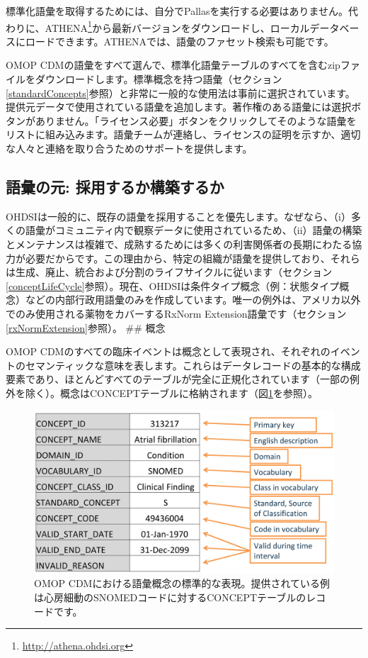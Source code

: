 \documentclass[
  11pt]{book}
\theoremstyle{definition}
\theoremstyle{definition}
\theoremstyle{definition}
\theoremstyle{definition}
\theoremstyle{remark}
\begin{document}
標準化語彙を取得するためには、自分でPallasを実行する必要はありません。代わりに、ATHENA\footnote{\url{http://athena.ohdsi.org}}から最新バージョンをダウンロードし、ローカルデータベースにロードできます。ATHENAでは、語彙のファセット検索も可能です。   

OMOP CDMの語彙をすべて選んで、標準化語彙テーブルのすべてを含むzipファイルをダウンロードします。標準概念を持つ語彙（セクション\ref{standardConcepts}参照）と非常に一般的な使用法は事前に選択されています。提供元データで使用されている語彙を追加します。著作権のある語彙には選択ボタンがありません。「ライセンス必要」ボタンをクリックしてそのような語彙をリストに組み込みます。語彙チームが連絡し、ライセンスの証明を示すか、適切な人々と連絡を取り合うためのサポートを提供します。

\subsection{語彙の元: 採用するか構築するか}\label{ux8a9eux5f59ux306eux5143-ux63a1ux7528ux3059ux308bux304bux69cbux7bc9ux3059ux308bux304b}

OHDSIは一般的に、既存の語彙を採用することを優先します。なぜなら、（i）多くの語彙がコミュニティ内で観察データに使用されているため、（ii）語彙の構築とメンテナンスは複雑で、成熟するためには多くの利害関係者の長期にわたる協力が必要だからです。この理由から、特定の組織が語彙を提供しており、それらは生成、廃止、統合および分割のライフサイクルに従います（セクション\ref{conceptLifeCycle}参照）。現在、OHDSIは条件タイプ概念（例：状態タイプ概念）などの内部行政用語彙のみを作成しています。唯一の例外は、アメリカ以外でのみ使用される薬物をカバーするRxNorm Extension語彙です（セクション\ref{rxNormExtension}参照）。
\#\# 概念

OMOP CDMのすべての臨床イベントは概念として表現され、それぞれのイベントのセマンティックな意味を表します。これらはデータレコードの基本的な構成要素であり、ほとんどすべてのテーブルが完全に正規化されています（一部の例外を除く）。概念はCONCEPTテーブルに格納されます（図\ref{fig:concept}を参照）。

\begin{figure}

{\centering \includegraphics[width=0.9\linewidth]{images/StandardizedVocabularies/concept} 

}

\caption{OMOP CDMにおける語彙概念の標準的な表現。提供されている例は心房細動のSNOMEDコードに対するCONCEPTテーブルのレコードです。}\label{fig:concept}
\end{figure}
\end{document}
